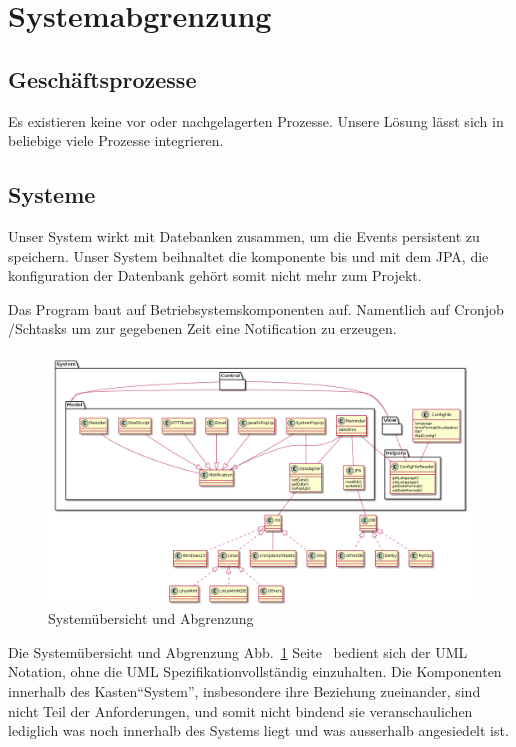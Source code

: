 \documentclass[11pt,titelpage]{scrreprt}
\begin{document}
\section {Systemabgrenzung}
\subsection{Geschäftsprozesse}
Es existieren keine vor\- oder nachgelagerten Prozesse. Unsere Lösung lässt sich in beliebige viele Prozesse integrieren.
\subsection{Systeme}
Unser System wirkt mit Datebanken zusammen, um die Events persistent zu speichern.  Unser System beihnaltet die komponente bis und mit dem JPA, die konfiguration der Datenbank gehört somit nicht mehr zum Projekt.

Das Program baut auf Betriebsystemskomponenten auf. Namentlich auf  Cronjob /Schtasks um zur gegebenen Zeit eine Notification zu erzeugen.
\begin{landscape}
\begin{figure}
  \centering
    \includegraphics[width=1\textwidth]{../uml/uebersicht.png}
  \caption{Systemübersicht und Abgrenzung}
  \label{fig:overview}
\end{figure}
\end{landscape}
Die Systemübersicht und Abgrenzung Abb.~\ref{fig:overview} Seite~\pageref{fig:overview} bedient sich der UML Notation, ohne die UML Spezifikationvollständig einzuhalten. Die Komponenten innerhalb des Kasten``System'', insbesondere ihre Beziehung zueinander,  sind nicht Teil der Anforderungen, und somit nicht bindend sie veranschaulichen lediglich was noch innerhalb des Systems liegt und was ausserhalb angesiedelt ist. 
\pageref{fig:overview}
\end{document}
